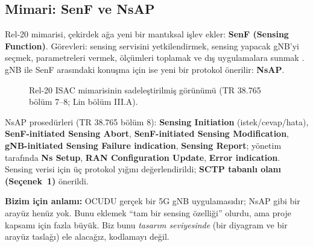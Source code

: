 \subsection{Mimari: SenF ve NsAP}\label{sec:senf}

Rel-20 mimarisi, çekirdek ağa yeni bir mantıksal işlev ekler: \textbf{SenF (Sensing Function)}. Görevleri: sensing servisini yetkilendirmek, sensing yapacak gNB'yi seçmek, parametreleri vermek, ölçümleri toplamak ve dış uygulamalara sunmak \cite{lin}.
gNB ile SenF arasındaki konuşma için ise yeni bir protokol önerilir: \textbf{NsAP}.

\begin{figure}[H]
\centering
{}
\caption{Rel-20 ISAC mimarisinin sadeleştirilmiş görünümü (TR 38.765 bölüm 7--8; Lin \cite{lin} bölüm III.A).}
\end{figure}

NsAP prosedürleri (TR 38.765 bölüm 8): \textbf{Sensing Initiation} (istek/cevap/hata), \textbf{SenF-initiated Sensing Abort}, \textbf{SenF-initiated Sensing Modification},
\textbf{gNB-initiated Sensing Failure indication}, \textbf{Sensing Report}; yönetim tarafında \textbf{Ns Setup}, \textbf{RAN Configuration Update}, \textbf{Error indication}.
Sensing verisi için üç protokol yığını değerlendirildi; \textbf{SCTP tabanlı olanı (Seçenek~1)} önerildi.

\textbf{Bizim için anlamı:} OCUDU gerçek bir 5G gNB uygulamasıdır; NsAP gibi bir arayüz henüz yok. Bunu eklemek ``tam bir sensing özelliği'' olurdu,
ama proje kapsamı için fazla büyük. Biz bunu \emph{tasarım seviyesinde} (bir diyagram ve bir arayüz taslağı) ele alacağız, kodlamayı değil.

